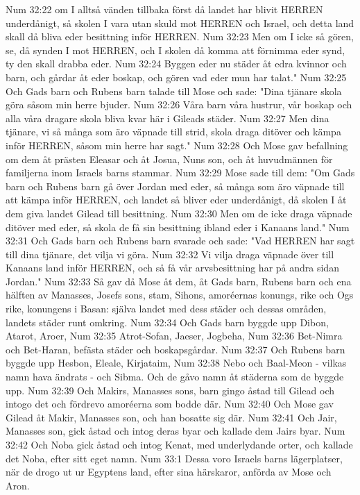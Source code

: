 Num 32:22  om I alltså vänden tillbaka först då landet har blivit HERREN underdånigt, så skolen I vara utan skuld mot HERREN och Israel, och detta land skall då bliva eder besittning inför HERREN.
Num 32:23  Men om I icke så gören, se, då synden I mot HERREN, och I skolen då komma att förnimma eder synd, ty den skall drabba eder.
Num 32:24  Byggen eder nu städer åt edra kvinnor och barn, och gårdar åt eder boskap, och gören vad eder mun har talat."
Num 32:25  Och Gads barn och Rubens barn talade till Mose och sade: "Dina tjänare skola göra såsom min herre bjuder.
Num 32:26  Våra barn våra hustrur, vår boskap och alla våra dragare skola bliva kvar här i Gileads städer.
Num 32:27  Men dina tjänare, vi så många som äro väpnade till strid, skola draga ditöver och kämpa inför HERREN, såsom min herre har sagt."
Num 32:28  Och Mose gav befallning om dem åt prästen Eleasar och åt Josua, Nuns son, och åt huvudmännen för familjerna inom Israels barns stammar.
Num 32:29  Mose sade till dem: "Om Gads barn och Rubens barn gå över Jordan med eder, så många som äro väpnade till att kämpa inför HERREN, och landet så bliver eder underdånigt, då skolen I åt dem giva landet Gilead till besittning.
Num 32:30  Men om de icke draga väpnade ditöver med eder, så skola de få sin besittning ibland eder i Kanaans land."
Num 32:31  Och Gads barn och Rubens barn svarade och sade: "Vad HERREN har sagt till dina tjänare, det vilja vi göra.
Num 32:32  Vi vilja draga väpnade över till Kanaans land inför HERREN, och så få vår arvsbesittning har på andra sidan Jordan."
Num 32:33  Så gav då Mose åt dem, åt Gads barn, Rubens barn och ena hälften av Manasses, Josefs sons, stam, Sihons, amoréernas konungs, rike och Ogs rike, konungens i Basan: själva landet med dess städer och dessas områden, landets städer runt omkring.
Num 32:34  Och Gads barn byggde upp Dibon, Atarot, Aroer,
Num 32:35  Atrot-Sofan, Jaeser, Jogbeha,
Num 32:36  Bet-Nimra och Bet-Haran, befästa städer och boskapsgårdar.
Num 32:37  Och Rubens barn byggde upp Hesbon, Eleale, Kirjataim,
Num 32:38  Nebo och Baal-Meon - vilkas namn hava ändrats - och Sibma. Och de gåvo namn åt städerna som de byggde upp.
Num 32:39  Och Makirs, Manasses sons, barn gingo åstad till Gilead och intogo det och fördrevo amoréerna som bodde där.
Num 32:40  Och Mose gav Gilead åt Makir, Manasses son, och han bosatte sig där.
Num 32:41  Och Jair, Manasses son, gick åstad och intog deras byar och kallade dem Jairs byar.
Num 32:42  Och Noba gick åstad och intog Kenat, med underlydande orter, och kallade det Noba, efter sitt eget namn.
Num 33:1  Dessa voro Israels barns lägerplatser, när de drogo ut ur Egyptens land, efter sina härskaror, anförda av Mose och Aron.
